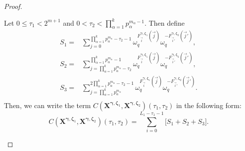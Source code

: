 \documentclass[10pt,a4paper]{amsart}
\theoremstyle{plain}
\begin{document}
\begin{proof}
		\begin{mycases}
			\item Let  $0 \leq \tau_1 < 2^{m+1}$ and $0 < \tau_2 < \prod_{\alpha=1}^{k} p_\alpha^{m_\alpha-1}$. Then define
			\begin{equation}
				\begin{split}
					S_1=&  \sum_{j=0}^{\prod_{\alpha=1}^{k} p_\alpha^{m_\alpha} -\tau_2-1} \omega_q^{ 	F_{ \vec{i}}^{\bm{\gamma}, \bm{\zeta}_1} (\vec{j}) } \omega_q^{ 	-F_{ \vec{i}'}^{\bm{\gamma}, \bm{\zeta}_2} (\vec{j}') },\\
					S_2=& \sum_{j= \prod_{\alpha=1}^{k} p_\alpha^{m_\alpha} -\tau_2 }^{\prod_{\alpha=1}^{k}  p_\alpha^{m_\alpha}-1} \omega_q^{ 	F_{ \vec{i}}^{\bm{\gamma}, \bm{\zeta}_1} (\vec{j}) } \omega_q^{ 	-F_{ \vec{i}'}^{\bm{\gamma}, \bm{\zeta}_2} (\vec{j}') },\\
					S_3=& \sum_{j= \prod_{\alpha=1}^{k} p_\alpha^{m_\alpha}}^{2 \prod_{\alpha=1}^{k} p_\alpha^{m_\alpha} -\tau_2-1} \omega_q^{ 	F_{ \vec{i}}^{\bm{\gamma}, \bm{\zeta}_1} (\vec{j}) } \omega_q^{ 	-F_{ \vec{i}'}^{\bm{\gamma}, \bm{\zeta}_2} (\vec{j}') }.\\
				\end{split}
			\end{equation}
			Then, we can write the term $ C\left( \mathbf{X}^{\bm{\gamma},\bm{\zeta}_1}, \mathbf{X}^{\bm{\gamma}, \bm{\zeta}_2} \right) (\tau_1, \tau_2)$ in the following form:
			\begin{equation}\label{eqn_S_sum}
				C\left( \mathbf{X}^{\bm{\gamma},\bm{\zeta}_1}, \mathbf{X}^{\bm{\gamma}, \bm{\zeta}_2} \right) (\tau_1, \tau_2)= \sum_{i=0}^{L_1 -\tau_1-1} \bigg[ S_1 + S_2+ S_3 \bigg].
			\end{equation}
			

\end{mycases}
\end{proof}
\end{document}
